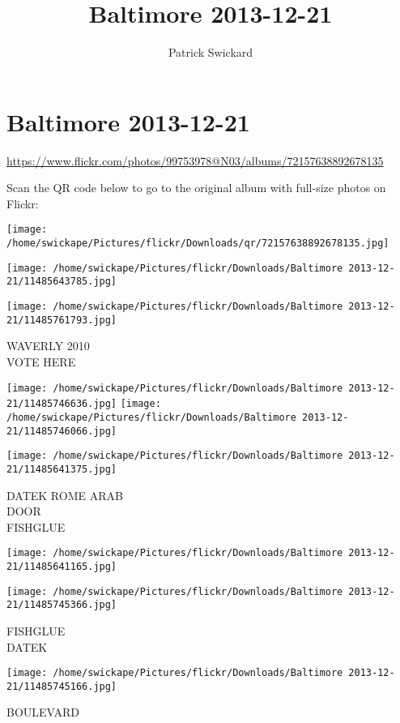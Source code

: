 \documentclass[10pt,letterpaper]{article}
\title{Baltimore 2013-12-21}
\author{Patrick Swickard}
\date{}
\begin{document}
\section*{Baltimore 2013-12-21}

\url{https://www.flickr.com/photos/99753978@N03/albums/72157638892678135}

Scan the QR code below to go to the original album with full-size photos on Flickr:

\texttt{[image: /home/swickape/Pictures/flickr/Downloads/qr/72157638892678135.jpg]}
\pagebreak

\texttt{[image: /home/swickape/Pictures/flickr/Downloads/Baltimore 2013-12-21/11485643785.jpg]}

\vspace{0.25in}
\texttt{[image: /home/swickape/Pictures/flickr/Downloads/Baltimore 2013-12-21/11485761793.jpg]}

WAVERLY 2010\\
VOTE HERE
\pagebreak

\texttt{[image: /home/swickape/Pictures/flickr/Downloads/Baltimore 2013-12-21/11485746636.jpg]}
\texttt{[image: /home/swickape/Pictures/flickr/Downloads/Baltimore 2013-12-21/11485746066.jpg]}

\texttt{[image: /home/swickape/Pictures/flickr/Downloads/Baltimore 2013-12-21/11485641375.jpg]}

DATEK ROME ARAB\\
DOOR\\
FISHGLUE
\pagebreak

\texttt{[image: /home/swickape/Pictures/flickr/Downloads/Baltimore 2013-12-21/11485641165.jpg]}

\vspace{0.25in}
\texttt{[image: /home/swickape/Pictures/flickr/Downloads/Baltimore 2013-12-21/11485745366.jpg]}

FISHGLUE\\
DATEK
\pagebreak

\texttt{[image: /home/swickape/Pictures/flickr/Downloads/Baltimore 2013-12-21/11485745166.jpg]}

BOULEVARD
\pagebreak
\end{document}
